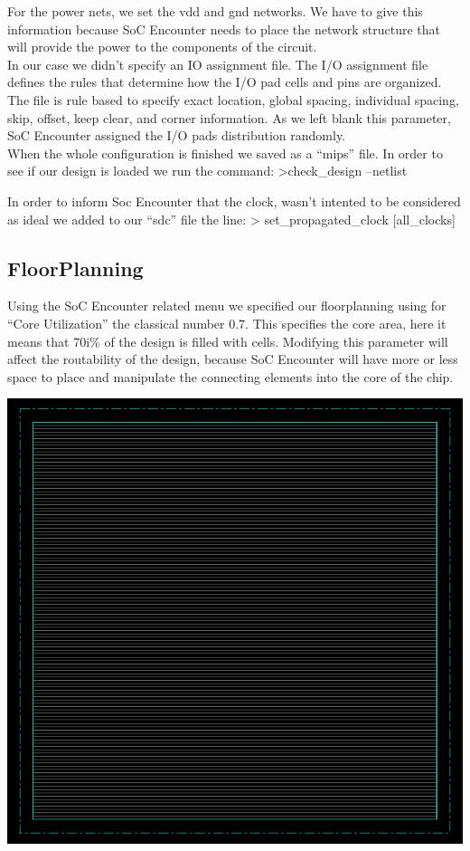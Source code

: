 \documentclass[12pt]{article}
\begin{document}
For the power nets, we set the vdd and gnd networks. We have to give this information because SoC Encounter needs to place the network structure that will provide the power to the components of the circuit.\\
In our case we didn’t specify an IO assignment file. The I/O assignment file defines the rules that determine how the I/O pad cells and pins are organized. The file is rule based to specify exact location, global spacing, individual spacing, skip, offset, keep clear, and corner information. As we left blank this parameter, SoC Encounter assigned the I/O pads distribution randomly.\\
When the whole configuration is finished we saved as a “mips” file. In order to see if our design is loaded we run the command:
>check\_design –netlist


In order to inform Soc Encounter that the clock, wasn’t intented to be considered as ideal we added to our “sdc” file the line: 
> set\_propagated\_clock [all\_clocks]
\subsection{FloorPlanning}
Using the SoC Encounter related menu we specified our floorplanning using for “Core Utilization” the classical number 0.7. This specifies the core area, here it means that 70i\% of the design is filled with cells. Modifying this parameter will affect the routability of the design, because SoC Encounter will have more or less space to place and manipulate the connecting elements into the core of the chip.\\
\begin{center}
\includegraphics[scale=0.4]{pic/floorplan.png}
\end{center}
\end{document}
